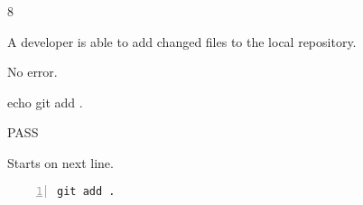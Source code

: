 \begin{description}[align=right,leftmargin=3.2cm,labelindent=3.0cm]
\item[Step:] 8
\item[Confirm:] A developer is able to add changed files to the local repository.
\item[Expectation:] No error.
\item[Command:] echo git  add .
\item[Test Result:] PASS
\item[Evidence:] Starts on next line.
\end{description}
\begin{lstlisting}[numbers=left]
git add .

\end{lstlisting}
